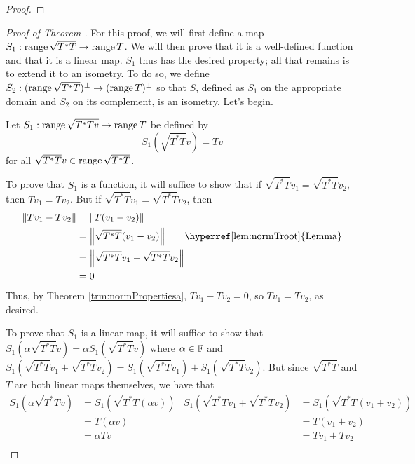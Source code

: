 \documentclass[../main.tex]{subfiles}
\begin{document}
\begin{itemize}
\begin{theorem}
\begin{lemma*}
\begin{proof}
            \end{proof}
        \end{lemma*}
        \begin{proof}[Proof of Theorem {\hyperref[trm:polarDecomp]{7.21}}]
            For this proof, we will first define a map $S_1:\operatorname{range}\sqrt{T^*T}\to\operatorname{range} T$. We will then prove that it is a well-defined function and that it is a linear map. $S_1$ thus has the desired property; all that remains is to extend it to an isometry. To do so, we define $S_2:(\operatorname{range}\sqrt{T^*T})^\perp\to(\operatorname{range} T)^\perp$ so that $S$, defined as $S_1$ on the appropriate domain and $S_2$ on its complement, is an isometry. Let's begin.\par\medskip
            Let $S_1:\operatorname{range}\sqrt{T^*Tv}\to\operatorname{range} T$ be defined by
            \begin{equation*}
                S_1(\sqrt{T^*T}v) = Tv
            \end{equation*}
            for all $\sqrt{T^*T}v\in\operatorname{range}\sqrt{T^*T}$.\par
            To prove that $S_1$ is a function, it will suffice to show that if $\sqrt{T^*T}v_1=\sqrt{T^*T}v_2$, then $Tv_1=Tv_2$. But if $\sqrt{T^*T}v_1=\sqrt{T^*T}v_2$, then
            \begin{align*}
                \norm{Tv_1-Tv_2} &= \norm{T(v_1-v_2)}\\
                &= \norm{\sqrt{T^*T}(v_1-v_2)}\tag*{\hyperref[lem:normTroot]{Lemma}}\\
                &= \norm{\sqrt{T^*T}v_1-\sqrt{T^*T}v_2}\\
                &= 0
            \end{align*}
            Thus, by Theorem \ref{trm:normPropertiesa}, $Tv_1-Tv_2=0$, so $Tv_1=Tv_2$, as desired.\par
            To prove that $S_1$ is a linear map, it will suffice to show that $S_1(\alpha\sqrt{T^*T}v)=\alpha S_1(\sqrt{T^*T}v)$ where $\alpha\in\mathbb{F}$ and $S_1(\sqrt{T^*T}v_1+\sqrt{T^*T}v_2)=S_1(\sqrt{T^*T}v_1)+S_1(\sqrt{T^*T}v_2)$. But since $\sqrt{T^*T}$ and $T$ are both linear maps themselves, we have that
            \begin{align*}
                S_1(\alpha\sqrt{T^*T}v) &= S_1(\sqrt{T^*T}(\alpha v))&
                    S_1(\sqrt{T^*T}v_1+\sqrt{T^*T}v_2) &= S_1(\sqrt{T^*T}(v_1+v_2))\\
                &= T(\alpha v)&
                    &= T(v_1+v_2)\\
                &= \alpha Tv&
                    &= Tv_1+Tv_2\\

\end{align*}
\end{proof}
\end{theorem}
\end{itemize}
\end{document}
